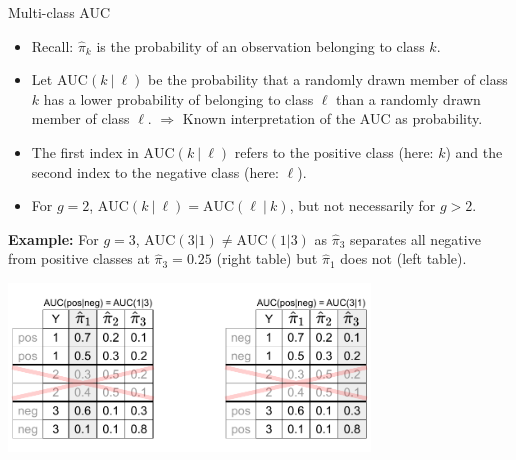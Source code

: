 

\begin{vbframe}{Multi-class AUC}

\begin{itemize}
\small
\item Recall: $\hat \pi_k$ is the probability of an observation belonging to class $k$.
\item Let $\text{AUC}(k ~|~ \ell)$ be the probability that a randomly drawn member of class $k$ has a lower probability of belonging to class $\ell$ than a randomly drawn member of class $\ell$.
$\Rightarrow$ Known interpretation of the AUC as probability.
\item The first index in $\text{AUC}(k ~|~ \ell)$ refers to the positive class (here: $k$) and the second index to the negative class (here: $\ell$).
\item For $g = 2$, $\text{AUC}(k ~|~ \ell) = \text{AUC}(\ell ~|~ k)$, but not necessarily for $g > 2$.
\end{itemize}
\small


\textbf{Example:} For $g=3$, $\text{AUC}(3|1) \neq \text{AUC}(1|3)$ as $\hat \pi_3$ separates all negative from positive classes at $\hat \pi_3 = 0.25$ (right table) but $\hat \pi_1$ does not (left table).

\centerline{\includegraphics[trim = 0 15 00 10, clip, width=0.72\textwidth]{figure_man/multiclass-auc.pdf}}

\end{vbframe}

